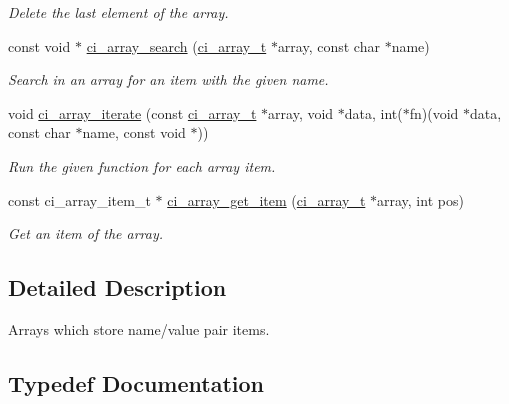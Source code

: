 \begin{DoxyCompactItemize}
\begin{DoxyCompactList}\small\item\em Delete the last element of the array. \item\end{DoxyCompactList}\item 
const void $\ast$ \hyperlink{group__SIMPLE__ARRAYS_gaa6879d90b23e4a1cd17cdebd389b2b6e}{ci\_\-array\_\-search} (\hyperlink{group__SIMPLE__ARRAYS_ga1bec5de79ca98bb53c039a8f8e959137}{ci\_\-array\_\-t} $\ast$array, const char $\ast$name)
\begin{DoxyCompactList}\small\item\em Search in an array for an item with the given name. \item\end{DoxyCompactList}\item 
void \hyperlink{group__SIMPLE__ARRAYS_gacb8aadb5dacd5a6e9c9de728601d5977}{ci\_\-array\_\-iterate} (const \hyperlink{group__SIMPLE__ARRAYS_ga1bec5de79ca98bb53c039a8f8e959137}{ci\_\-array\_\-t} $\ast$array, void $\ast$data, int($\ast$fn)(void $\ast$data, const char $\ast$name, const void $\ast$))
\begin{DoxyCompactList}\small\item\em Run the given function for each array item. \item\end{DoxyCompactList}\item 
const ci\_\-array\_\-item\_\-t $\ast$ \hyperlink{group__SIMPLE__ARRAYS_gabdd79d08b37d9bfd1577ce52ece12a5c}{ci\_\-array\_\-get\_\-item} (\hyperlink{group__SIMPLE__ARRAYS_ga1bec5de79ca98bb53c039a8f8e959137}{ci\_\-array\_\-t} $\ast$array, int pos)
\begin{DoxyCompactList}\small\item\em Get an item of the array. \item\end{DoxyCompactList}\end{DoxyCompactItemize}


\subsection{Detailed Description}
Arrays which store name/value pair items. 

\subsection{Typedef Documentation}
\hypertarget{group__SIMPLE__ARRAYS_ga1bec5de79ca98bb53c039a8f8e959137}{
\subsubsection[{ci\_\-array\_\-t}]{}}
\label{group__SIMPLE__ARRAYS_ga1bec5de79ca98bb53c039a8f8e959137}


